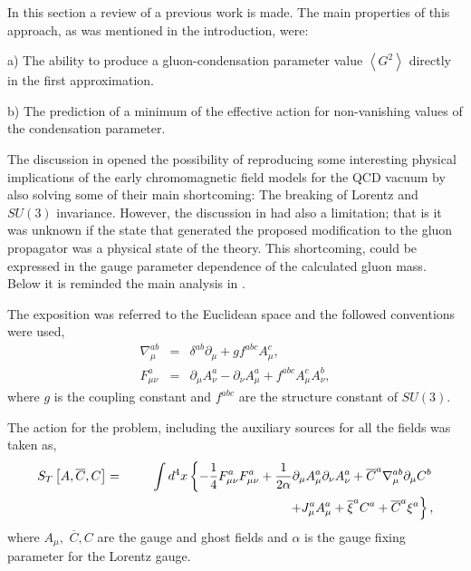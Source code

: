 \documentclass[12pt,letterpaper]{report}
\begin{document}
In this section a review of a previous work \cite{Cabo} is made.
The main properties of this approach, as was mentioned in the
introduction, were:

a) The ability to produce a gluon-condensation parameter value
$\left\langle G^2\right\rangle $ directly in the first
approximation.

b) The prediction of a minimum of the effective action for
non-vanishing values of the condensation parameter.

The discussion in \cite{Cabo} opened the possibility of
reproducing some interesting physical implications of the early
chromomagnetic field models for the QCD vacuum \cite{Savv1,Savv2}
by also solving some of their main shortcoming: The breaking of
Lorentz and $SU\left(3\right)$ invariance. However, the discussion
in \cite{Cabo} had also a limitation; that is it was unknown if
the state that generated the proposed modification to the gluon
propagator was a physical state of the theory. This shortcoming,
could be expressed in the gauge parameter dependence of the
calculated gluon mass. Below it is reminded the main analysis in
\cite{Cabo}.

\newpage

The exposition was referred to the Euclidean space and the
followed conventions were used,
\begin{eqnarray*}
\nabla _\mu ^{ab} &=&\delta ^{ab}\partial _\mu +gf^{abc}A_\mu ^c,
\\ F_{\mu \nu }^a &=&\partial _\mu A_\nu ^a-\partial _\nu A_\mu
^a+f^{abc}A_\mu ^cA_\nu ^b,
\end{eqnarray*}
where $g$ is the coupling constant and $f^{abc}$ are the structure
constant of $SU(3)$.

The action for the problem, including the auxiliary sources for
all the fields was taken as,
\begin{eqnarray*}
S_T\left[ A,\overline{C},C\right] &=&\int d^4x\left\{ -\frac
14F_{\mu \nu }^aF_{\mu \nu }^a+\frac 1{2\alpha }\partial _\mu
A_\mu ^a\partial _\nu A_\nu ^a+\overline{C}^a\nabla _\mu
^{ab}\partial _\mu C^b\right. \\ &&\text{ \qquad \qquad \qquad
\qquad \qquad \qquad }\left. +J_\mu ^aA_\mu ^a+ \overline{\xi
}^aC^a+\overline{C}^a\xi ^a\right\},
\end{eqnarray*}
where $A_\mu,$ $\overline{C},C$ are the gauge and ghost fields and
$\alpha $ is the gauge fixing parameter \cite{Faddeev} for the
Lorentz gauge.
\end{document}
